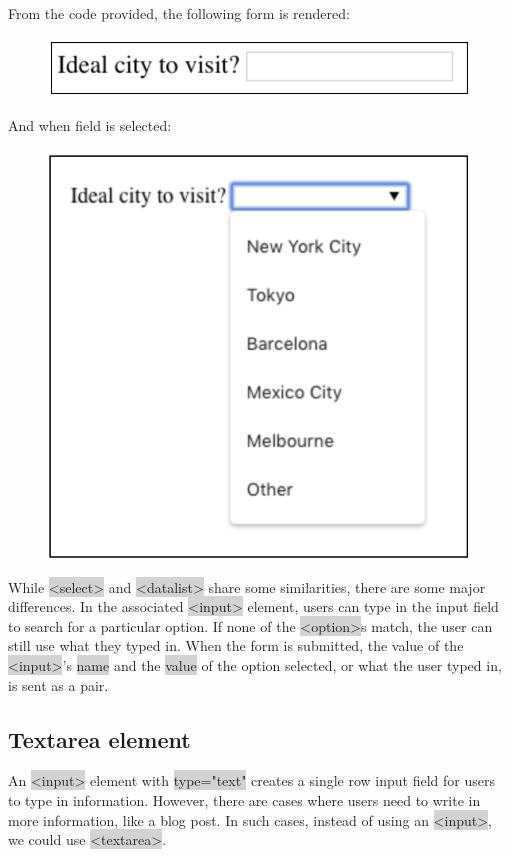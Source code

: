 \documentclass[11pt]{article}
\begin{document}
From the code provided, the following form is rendered:
\begin{figure}[H]
\includegraphics[scale = 0.5]{3_13}
\centering
\end{figure}
\vspace{-4mm}
And when field is selected:
\begin{figure}[H]
\includegraphics[scale = 0.5]{3_14}
\centering
\end{figure}
\vspace{-4mm}
While \colorbox{lightgray}{<select>} and \colorbox{lightgray}{<datalist>} share some similarities, there are some major differences. In the associated \colorbox{lightgray}{<input>} element, users can type in the input field to search for a particular option. If none of the \colorbox{lightgray}{<option>}s match, the user can still use what they typed in. When the form is submitted, the value of the \colorbox{lightgray}{<input>}'s \colorbox{lightgray}{name} and the \colorbox{lightgray}{value} of the option selected, or what the user typed in, is sent as a pair.

\subsection{Textarea element}
An \colorbox{lightgray}{<input>} element with \colorbox{lightgray}{type="text"} creates a single row input field for users to type in information. However, there are cases where users need to write in more information, like a blog post. In such cases, instead of using an \colorbox{lightgray}{<input>}, we could use \colorbox{lightgray}{<textarea>}.
\end{document}
